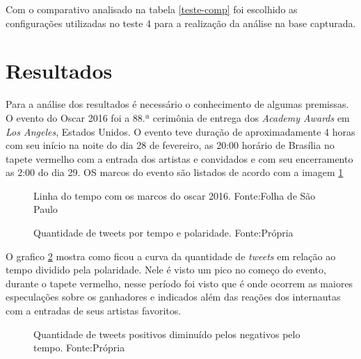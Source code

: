Com o comparativo analisado na tabela \ref{teste-comp} foi escolhido as configurações utilizadas no teste 4 para a realização da análise na base capturada.

\section{Resultados}\label{result}

Para a análise dos resultados é necessário o conhecimento de algumas premissas. O evento do Oscar 2016 foi a  88.ª cerimônia de entrega dos \textit{Academy Awards} em \textit{Los Angeles}, Estados Unidos. O evento teve duração de aproximadamente 4 horas com seu início na noite do dia 28 de fevereiro, as 20:00 horário de Brasília no tapete vermelho com a entrada dos artistas e convidados e  com seu encerramento as 2:00 do dia 29. OS marcos do evento são listados de acordo com a imagem \ref{time}

\begin{figure}[!h]
	\centering{}
	\caption{Linha do tempo com os marcos do oscar 2016. Fonte:Folha de São Paulo}
	\label{time}
\end{figure}

\begin{figure}[!h]
	\centering{}
	\caption{Quantidade de tweets por tempo e polaridade. Fonte:Própria}
	\label{qtd}
\end{figure}
O grafico \ref{qtd} mostra como ficou a curva da quantidade de \textit{tweets} em relação ao tempo  dividido pela polaridade. Nele é visto um pico  no começo do evento, durante o tapete vermelho, nesse período foi visto que é onde ocorrem as maiores especulações sobre os ganhadores e indicados além das reações dos internautas com a entradas de seus artistas favoritos.

\begin{figure}[!h]
	\centering{}
	\caption{Quantidade de tweets positivos diminuído pelos negativos pelo tempo. Fonte:Própria}
	\label{qtdnegpos}
\end{figure}

